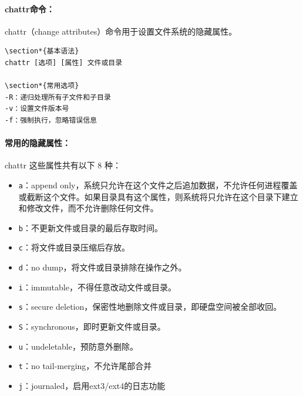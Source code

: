\documentclass[12pt,UTF8]{ctexbook}
\begin{document}
\paragraph{chattr命令：}
chattr（change attributes）命令用于设置文件系统的隐藏属性。

\begin{verbatim}
\section*{基本语法}
chattr [选项] [属性] 文件或目录

\section*{常用选项}
-R：递归处理所有子文件和子目录
-v：设置文件版本号
-f：强制执行，忽略错误信息
\end{verbatim}

\paragraph{常用的隐藏属性：}
chattr 这些属性共有以下 8 种：
\begin{itemize}
    \item \verb+a+：append only，系统只允许在这个文件之后追加数据，不允许任何进程覆盖或截断这个文件。如果目录具有这个属性，则系统将只允许在这个目录下建立和修改文件，而不允许删除任何文件。
    \item \verb+b+：不更新文件或目录的最后存取时间。
    \item \verb+c+：将文件或目录压缩后存放。
    \item \verb+d+：no dump，将文件或目录排除在操作之外。
    \item \verb+i+：immutable，不得任意改动文件或目录。
    \item \verb+s+：secure deletion，保密性地删除文件或目录，即硬盘空间被全部收回。
    \item \verb+S+：synchronous，即时更新文件或目录。
    \item \verb+u+：undeletable，预防意外删除。
    \item \verb+t+：no tail-merging，不允许尾部合并
    \item \verb+j+：journaled，启用ext3/ext4的日志功能
\end{itemize}
\end{document}
